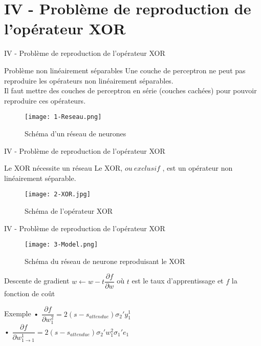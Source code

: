 
\section{IV - Problème de reproduction de l'opérateur XOR}
\begin{frame}{IV - Problème de reproduction de l'opérateur XOR}
	\begin{block}{Problème non linéairement séparables}
		Une couche de perceptron ne peut pas reproduire les opérateurs non linéairement séparables. \\
		Il faut mettre des couches de perceptron en série (couches cachées) pour pouvoir reproduire ces opérateurs. \\
	\end{block}
	\begin{figure}
		\centering
		\texttt{[image: 1-Reseau.png]}
		\caption{Schéma d'un réseau de neurones}
	\end{figure}
\end{frame}


\begin{frame}{IV - Problème de reproduction de l'opérateur XOR}
	\begin{block}{Le XOR nécessite un réseau}
		Le XOR, \og $ou\ exclusif$ \fg, est un opérateur non linéairement séparable. \\
	\end{block}
	\begin{figure}
		\centering
		\texttt{[image: 2-XOR.jpg]}
		\caption{Schéma de l'opérateur XOR}
	\end{figure}
\end{frame}


\begin{frame}{IV - Problème de reproduction de l'opérateur XOR}
	\begin{figure}
		\centering
		\texttt{[image: 3-Model.png]}
		\caption{Schéma du réseau de neurone reproduisant le XOR}
	\end{figure}
	\begin{block}{Descente de gradient}
		$w \leftarrow w - t \dfrac{\partial f}{\partial w}$ où $t$ est le taux d'apprentissage et $f$ la fonction de coût
	\end{block}
	\begin{exampleblock}{Exemple}
		• $\dfrac{\partial f}{\partial w^2_1} = 2(s - s_{attendue})\sigma_2 'y^1_1$ \\
		• $\dfrac{\partial f}{\partial w^1_{1\to 1}} = 2(s - s_{attendue})\sigma_2 'w^2_1 \sigma _{1} ' e_{1}$
	\end{exampleblock}
\end{frame}


